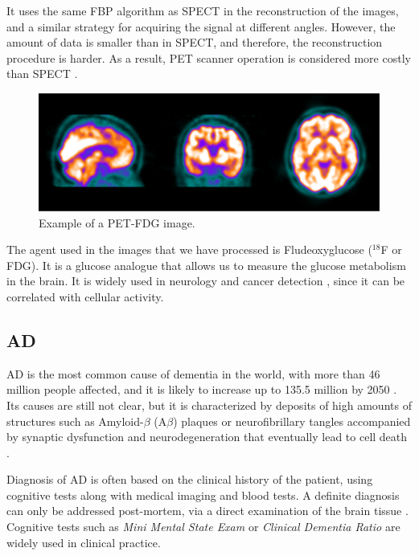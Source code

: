 It uses the same \ac{FBP} algorithm as \ac{SPECT} in the reconstruction of the images, and a similar strategy for acquiring the signal at different angles. However, the amount of data is smaller than in \ac{SPECT}, and therefore, the reconstruction procedure is harder. As a result, \ac{PET} scanner operation is considered more costly than \ac{SPECT} \cite{Carlson2016}.  

\begin{figure}[p]
	\centering
	\includegraphics[width=0.8\linewidth]{Graphics/ch2/example_PET}
	\caption[Example of a \acs{PET}-FDG image.]{Example of a \acs{PET}-FDG image.}
	\label{fig:example_PET}
\end{figure}

The agent used in the images that we have processed is Fludeoxyglucose ($^{18}$F or FDG). It is a glucose analogue that allows us to measure the glucose metabolism in the brain. It is widely used in neurology \cite{Newberg2002} and cancer detection \cite{Kelloff2005}, since it can be correlated with cellular activity. 

\label{sec:disorders}
\subsection{\acf{AD}}
\acf{AD} is the most common cause of dementia in the world, with more than 46 million people affected, and it is likely to increase up to 135.5 million by 2050 \cite{Association2016}. Its causes are still not clear, but it is characterized by deposits of high amounts of structures such as Amyloid-$\beta$ (A$\beta$) plaques or neurofibrillary tangles accompanied by synaptic dysfunction and neurodegeneration that eventually lead to cell death \cite{Ballard2011,Sevigny2016}.

Diagnosis of \ac{AD} is often based on the clinical history of the patient, using cognitive tests along with medical imaging and blood tests. A definite diagnosis can only be addressed post-mortem, via a direct examination of the brain tissue \cite{Ballard2011}. Cognitive tests such as \textit{Mini Mental State Exam} or \textit{Clinical Dementia Ratio} are widely used in clinical practice. 


